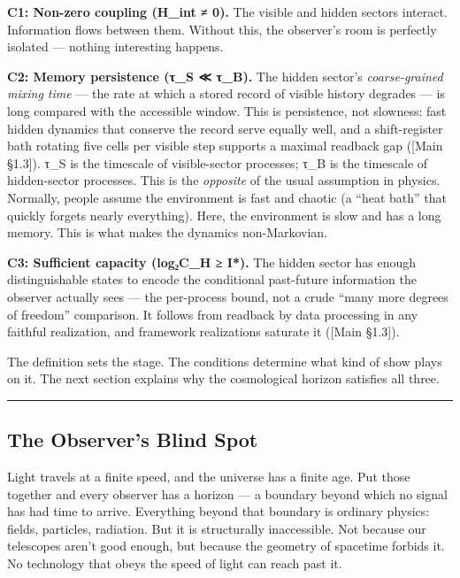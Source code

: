 \documentclass[
]{article}
\begin{document}
\textbf{C1: Non-zero coupling (H\_int ≠ 0).} The visible and hidden
sectors interact. Information flows between them. Without this, the
observer's room is perfectly isolated --- nothing interesting happens.

\textbf{C2: Memory persistence (τ\_S ≪ τ\_B).} The hidden sector's
\emph{coarse-grained mixing time} --- the rate at which a stored record
of visible history degrades --- is long compared with the accessible
window. This is persistence, not slowness: fast hidden dynamics that
conserve the record serve equally well, and a shift-register bath
rotating five cells per visible step supports a maximal readback gap
({[}Main §1.3{]}). τ\_S is the timescale of visible-sector processes;
τ\_B is the timescale of hidden-sector processes. This is the
\emph{opposite} of the usual assumption in physics. Normally, people
assume the environment is fast and chaotic (a ``heat bath'' that quickly
forgets nearly everything). Here, the environment is slow and has a long
memory. This is what makes the dynamics non-Markovian.

\textbf{C3: Sufficient capacity (log₂\textbar C\_H\textbar{} ≥ I*).} The
hidden sector has enough distinguishable states to encode the
conditional past-future information the observer actually sees --- the
per-process bound, not a crude ``many more degrees of freedom''
comparison. It follows from readback by data processing in any faithful
realization, and framework realizations saturate it ({[}Main §1.3{]}).

The definition sets the stage. The conditions determine what kind of
show plays on it. The next section explains why the cosmological horizon
satisfies all three.

\begin{center}\rule{0.5\linewidth}{0.5pt}\end{center}

\hypertarget{the-observers-blind-spot}{%
\subsection{The Observer's Blind Spot}\label{the-observers-blind-spot}}

Light travels at a finite speed, and the universe has a finite age. Put
those together and every observer has a horizon --- a boundary beyond
which no signal has had time to arrive. Everything beyond that boundary
is ordinary physics: fields, particles, radiation. But it is
structurally inaccessible. Not because our telescopes aren't good
enough, but because the geometry of spacetime forbids it. No technology
that obeys the speed of light can reach past it.
\end{document}
